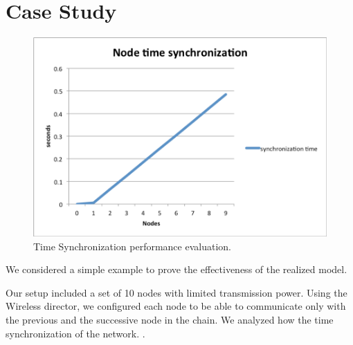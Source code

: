 
\section{Case Study}
\label{sec:case-study}

\begin{figure}[t]
\centering
\includegraphics[width=1\columnwidth]{figures/timesynch}
\caption{Time Synchronization performance evaluation.}
\label{fig:timeCorrection}
\end{figure}


We considered a simple example to prove the effectiveness of the realized model.

Our setup included a set of 10 nodes with limited transmission power. Using the Wireless director, we configured each node to be able to communicate only with the previous and the successive node in the chain.
We analyzed how the time synchronization of the network.
.

